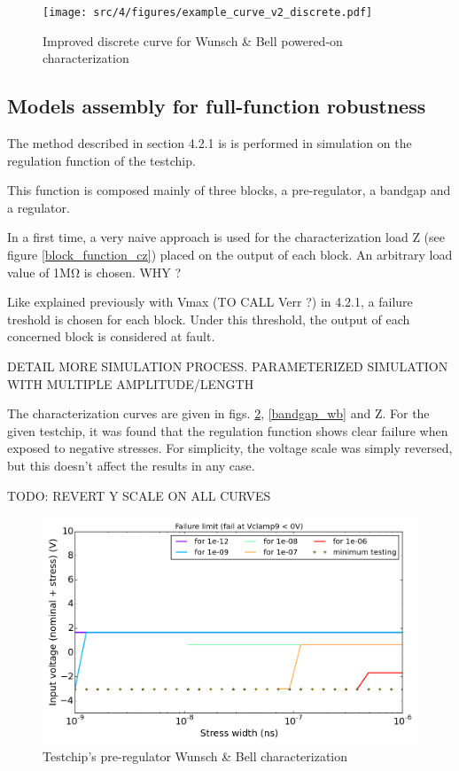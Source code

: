 \begin{figure}[!htbp]
  \centering
  \texttt{[image: src/4/figures/example\_curve\_v2\_discrete.pdf]}
  \caption{Improved discrete curve for Wunsch & Bell powered-on characterization}
  \label{wb_cz_curve_example_v2_discrete}
\end{figure}

\subsection{Models assembly for full-function robustness}

The method described in section 4.2.1 is is performed in simulation on the regulation function of the testchip.

This function is composed mainly of three blocks, a pre-regulator, a bandgap and a regulator.

In a first time, a very naive approach is used for the characterization load Z (see figure \ref{block_function_cz}) placed on the output of each block.
An arbitrary load value of 1MΩ is chosen. WHY ?

Like explained previously with Vmax (TO CALL Verr ?) in 4.2.1, a failure treshold is chosen for each block.
Under this threshold, the output of each concerned block is considered at fault.

DETAIL MORE SIMULATION PROCESS. PARAMETERIZED SIMULATION WITH MULTIPLE AMPLITUDE/LENGTH

The characterization curves are given in figs. \ref{pre_regu_wb}, \ref{bandgap_wb} and Z.
For the given testchip, it was found that the regulation function shows clear failure when exposed to negative stresses.
For simplicity, the voltage scale was simply reversed, but this doesn't affect the results in any case.

TODO: REVERT Y SCALE ON ALL CURVES

\begin{figure}[!htbp]
  \centering
  \includegraphics[width=\textwidth]{src/4/figures/cz_vpre.png}
  \caption{Testchip's pre-regulator Wunsch & Bell characterization}
  \label{pre_regu_wb}
\end{figure}

